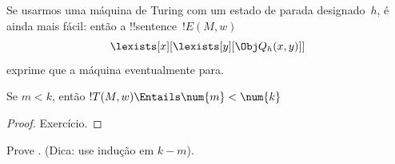 \documentclass[../../../include/open-logic-section]{subfiles}
\begin{document}
Se usarmos uma máquina de Turing com um estado de parada
designado~$h$, é ainda mais fácil: então a !!{sentence}~$!E(M, w)$
\[
\lexists[x][\lexists[y][\Obj Q_h(x, y)]]
\]
exprime que a máquina eventualmente para.

\begin{prop}
Se $m < k$, então $!T(M, w) \Entails \num{m} < \num{k}$
\end{prop}

\begin{proof}
Exercício.
\end{proof}

\begin{prob}
Prove .
(Dica: use indução em $k-m$).
\end{prob}
\end{document}
